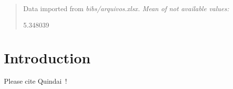 \documentclass[12pt]{article}
\begin{document}
\maketitle

\begin{abstract}
Data imported from \em{bibs/arquivos.xlsx}. Mean of not available values: 

5.348039
\end{abstract}
\section{Introduction}
\label{sec:introduction}
Please cite Quindai~\cite{quindai2020slr}!


\end{document}
